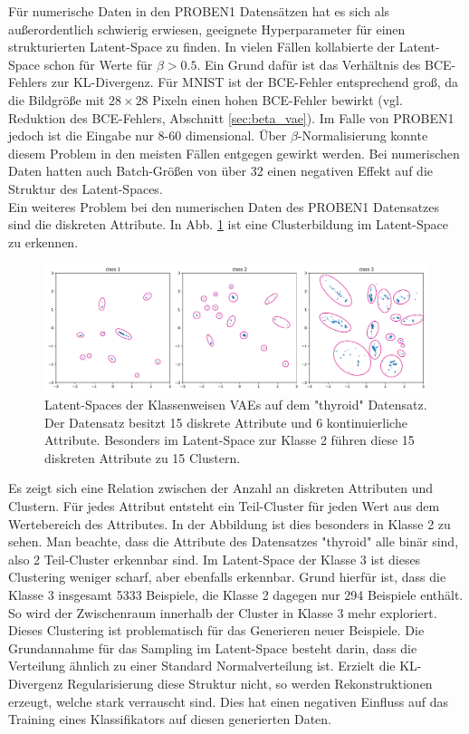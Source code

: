 Für numerische Daten in den PROBEN1 Datensätzen hat es sich als außerordentlich schwierig erwiesen, geeignete Hyperparameter für einen strukturierten Latent-Space zu finden. In vielen Fällen kollabierte der Latent-Space schon für Werte für $\beta > 0.5$. Ein Grund dafür ist das Verhältnis des BCE-Fehlers zur KL-Divergenz. Für MNIST ist der BCE-Fehler entsprechend groß, da die Bildgröße mit $28 \times 28$ Pixeln einen hohen BCE-Fehler bewirkt (vgl. Reduktion des BCE-Fehlers, Abschnitt \ref{sec:beta_vae}). Im Falle von PROBEN1 jedoch ist die Eingabe nur 8-60 dimensional. Über $\beta$-Normalisierung konnte diesem Problem in den meisten Fällen entgegen gewirkt werden. Bei numerischen Daten hatten auch Batch-Größen von über 32 einen negativen Effekt auf die Struktur des Latent-Spaces. \\

Ein weiteres Problem bei den numerischen Daten des PROBEN1 Datensatzes sind die diskreten Attribute. In Abb. \ref{fig:discrete_problem} ist eine Clusterbildung im Latent-Space zu erkennen.
\begin{figure}[H]
  \centering
  \includegraphics[width=\textwidth]{gfx/evaluation/feature_space/discrete_problem_with_cluster}
  \caption{Latent-Spaces der Klassenweisen VAEs auf dem "thyroid" Datensatz. Der Datensatz besitzt 15 diskrete Attribute und 6 kontinuierliche Attribute. Besonders im Latent-Space zur Klasse 2 führen diese 15 diskreten Attribute zu 15 Clustern.}
  \label{fig:discrete_problem}
\end{figure}
Es zeigt sich eine Relation zwischen der Anzahl an diskreten Attributen und Clustern. Für jedes Attribut entsteht ein Teil-Cluster für jeden Wert aus dem Wertebereich des Attributes. In der Abbildung ist dies besonders in Klasse 2 zu sehen. Man beachte, dass die Attribute des Datensatzes "thyroid" alle binär sind, also 2 Teil-Cluster erkennbar sind. Im Latent-Space der Klasse 3 ist dieses Clustering weniger scharf, aber ebenfalls erkennbar. Grund hierfür ist, dass die Klasse 3 insgesamt 5333 Beispiele, die Klasse 2 dagegen nur 294 Beispiele enthält. So wird der Zwischenraum innerhalb der Cluster in Klasse 3 mehr exploriert. Dieses Clustering ist problematisch für das Generieren neuer Beispiele. Die Grundannahme für das Sampling im Latent-Space besteht darin, dass die Verteilung ähnlich zu einer Standard Normalverteilung ist. Erzielt die KL-Divergenz Regularisierung diese Struktur nicht, so werden Rekonstruktionen erzeugt, welche stark verrauscht sind. Dies hat einen negativen Einfluss auf das Training eines Klassifikators auf diesen generierten Daten.




